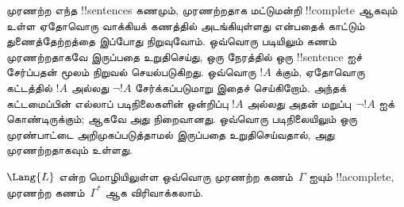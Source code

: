 \documentclass[../../../include/open-logic-section]{subfiles}
\begin{document}
      {}
      {}


\begin{explain}
முரணற்ற எந்த !!{sentence}s கணமும், முரணற்றதாக மட்டுமன்றி !!{complete}
ஆகவும் உள்ள ஏதோவொரு வாக்கியக் கணத்தில் அடங்கியுள்ளது என்பதைக் காட்டும்
துணைத்தேற்றத்தை இப்போது நிறுவுவோம். ஒவ்வொரு படியிலும் கணம் முரணற்றதாகவே
இருப்பதை உறுதிசெய்து, ஒரு நேரத்தில் ஒரு !!{sentence} ஐச் சேர்ப்பதன் மூலம்
நிறுவல் செயல்படுகிறது. ஒவ்வொரு $!A$ க்கும், ஏதோவொரு கட்டத்தில் $!A$ அல்லது
$\lnot !A$ சேர்க்கப்படுமாறு இதைச் செய்கிறோம். அந்தக் கட்டமைப்பின் எல்லாப்
படிநிலைகளின் ஒன்றிப்பு $!A$ அல்லது அதன் மறுப்பு~$\lnot !A$ ஐக் கொண்டிருக்கும்;
ஆகவே அது நிறைவானது. ஒவ்வொரு படிநிலையிலும் ஒரு முரண்பாட்டை அறிமுகப்படுத்தாமல்
இருப்பதை உறுதிசெய்வதால், அது முரணற்றதாகவும் உள்ளது.
\end{explain}

\begin{lem}[லிண்டன்பாமின் துணைத்தேற்றம்]
 $\Lang{L}$ என்ற மொழியிலுள்ள ஒவ்வொரு முரணற்ற
கணம்~$\Gamma$ ஐயும் !!a{complete}, முரணற்ற கணம்~$\Gamma^*$ ஆக
விரிவாக்கலாம்.
\end{lem}
\end{document}
